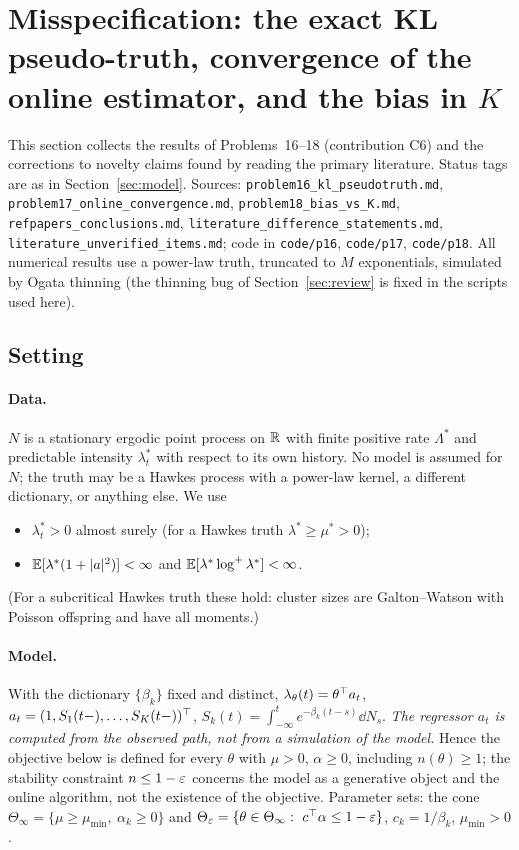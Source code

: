 \section{Misspecification: the exact KL pseudo-truth, convergence of the online estimator, and the bias in $K$}\label{sec:mis}

This section collects the results of Problems~16--18 (contribution C6) and the corrections to novelty claims found by reading the primary literature.
Status tags are as in Section~\ref{sec:model}.
Sources: \texttt{problem16\_kl\_pseudotruth.md}, \texttt{problem17\_online\_convergence.md}, \texttt{problem18\_bias\_vs\_K.md}, \texttt{refpapers\_conclusions.md}, \texttt{literature\_difference\_statements.md}, \texttt{literature\_unverified\_items.md}; code in \texttt{code/p16}, \texttt{code/p17}, \texttt{code/p18}.
All numerical results use a power-law truth, truncated to $M$ exponentials, simulated by Ogata thinning (the thinning bug of Section~\ref{sec:review} is fixed in the scripts used here).

\subsection{Setting}\label{sec:mis-setting}

\paragraph{Data.} $N$ is a stationary ergodic point process on $\mathbb{R}$ with finite positive rate $\Lambda^*$ and predictable intensity $\lambda^*_t$ with respect to its own history.
No model is assumed for $N$; the truth may be a Hawkes process with a power-law kernel, a different dictionary, or anything else.
We use
\begin{itemize}[nosep]
\item[(A1)] $\lambda^*_t>0$ almost surely (for a Hawkes truth $\lambda^*\ge\mu^*>0$);
\item[(A2)] $\mathbb{E}[\lambda^*(1+\lvert a\rvert^2)]<\infty$ and $\mathbb{E}[\lambda^*\log^+\lambda^*]<\infty$.
\end{itemize}
(For a subcritical Hawkes truth these hold: cluster sizes are Galton--Watson with Poisson offspring and have all moments.)

\paragraph{Model.} With the dictionary $\{\beta_k\}$ fixed and distinct, $\lambda_\theta(t)=\theta^{\top} a_t$, $a_t=(1,S_1(t-),\dots,S_K(t-))^{\top}$, $S_k(t)=\int_{-\infty}^te^{-\beta_k(t-s)}\dd N_s$.
\emph{The regressor $a_t$ is computed from the observed path, not from a simulation of the model.}
Hence the objective below is defined for every $\theta$ with $\mu>0$, $\alpha\ge0$, including $n(\theta)\ge1$; the stability constraint $n\le1-\varepsilon$ concerns the model as a generative object and the online algorithm, not the existence of the objective.
Parameter sets: the cone $\Theta_\infty=\{\mu\ge\mu_{\min},\ \alpha_k\ge0\}$ and $\Theta_\eps=\{\theta\in\Theta_\infty:\ c\T\alpha\le1-\eps\}$, $c_k=1/\beta_k$, $\mu_{\min}>0$.


